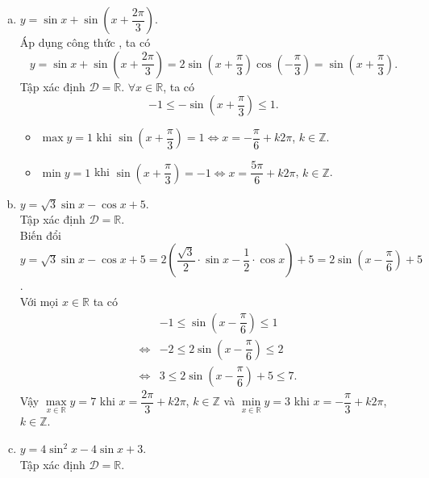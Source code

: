 \begin{bt}
{\begin{enumerate}[a)]
\begin{itemize}
			      \end{itemize}
			\item $ y=\sin x+\sin \left(x+{\dfrac{2\pi}{3}}\right)$.\\
			      Áp dụng công thức , ta có
			      \begin{equation*}
				      y=\sin x + \sin \left (x+\dfrac{2\pi}{3}\right ) = 2 \sin \left(x+\dfrac{\pi}{3}\right) \cos \left(-\dfrac{\pi}{3}\right)=\sin \left (x+\dfrac{\pi}{3}\right ).
			      \end{equation*}
			      Tập xác định $ \mathscr{D}=\mathbb{R}$. $ \forall x \in \mathbb{R} $, ta có
			      \begin{equation*}
				      -1 \leq -\sin \left (x+\dfrac{\pi}{3}\right ) \leq 1.
			      \end{equation*}
			      \begin{itemize}
				      \item $ \max y=1 $ khi $ \sin \left (x+\dfrac{\pi}{3}\right )=1 \Leftrightarrow x=-\dfrac{\pi}{6}+k2\pi$, $k\in \mathbb{Z}$.
				      \item $ \min y=1 $ khi $ \sin \left (x+\dfrac{\pi}{3}\right )=-1 \Leftrightarrow x=\dfrac{5\pi}{6}+k2\pi$, $k\in \mathbb{Z}$.
			      \end{itemize}
			\item $y=\sqrt{3} \sin x-\cos x+5$.\\
			      Tập xác định $\mathscr{D}=\mathbb{R}$.\\
			      Biến đổi $y=\sqrt{3} \sin x-\cos x+5=2\left(\dfrac{\sqrt{3}}{2}\cdot\sin x-\dfrac{1}{2}\cdot\cos x\right)+5=2\sin\left(x-\dfrac{\pi}{6}\right)+5$.\\
			      Với mọi $x\in \mathbb{R}$ ta có
			      \allowdisplaybreaks
			      \begin{eqnarray*}
				      & & -1\leq \sin\left(x-\dfrac{\pi}{6}\right)\leq 1\\
				      &\Leftrightarrow& -2\leq 2\sin\left(x-\dfrac{\pi}{6}\right)\leq 2\\
				      &\Leftrightarrow&3\leq  2\sin\left(x-\dfrac{\pi}{6}\right)+5\leq 7.
			      \end{eqnarray*}
			      Vậy $\max\limits_{x \in \mathbb{R}} y=7$ khi $x=\dfrac{2\pi}{3}+k2\pi$, $k\in \mathbb{Z}$ và $\min\limits_{x \in \mathbb{R}} y=3$ khi $x=-\dfrac{\pi}{3}+k2\pi$, $k\in \mathbb{Z}$.
			\item $y=4 \sin^2 x-4 \sin x+3$. \\
			      Tập xác định $\mathscr{D}=\mathbb{R}$.\\

\end{enumerate}}
\end{bt}
